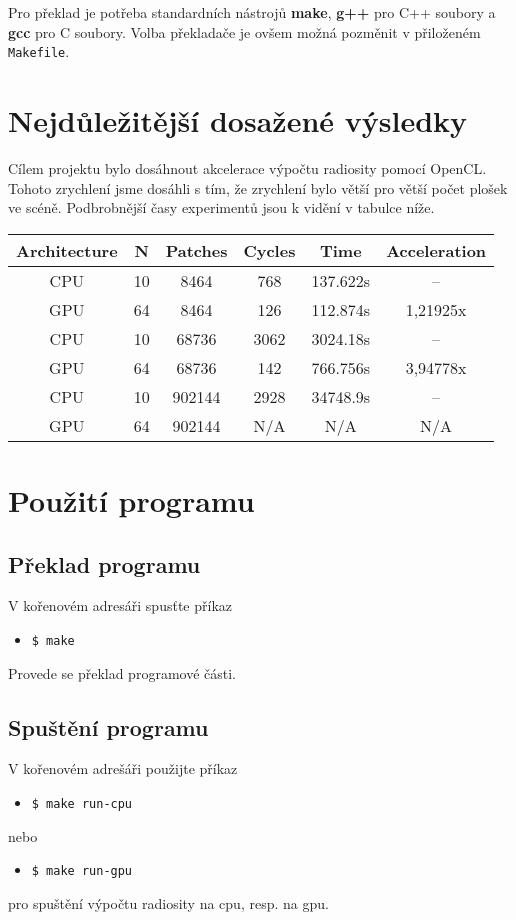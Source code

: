 \documentclass[11pt,a4paper]{article}
\begin{document}
Pro překlad je potřeba standardních nástrojů \textbf{make}, \textbf{g++} pro C++ soubory a \textbf{gcc} pro C soubory. Volba překladače je ovšem možná pozměnit v přiloženém \texttt{Makefile}.


\section{Nejdůležitější dosažené výsledky}
Cílem projektu bylo dosáhnout akcelerace výpočtu radiosity pomocí OpenCL. Tohoto zrychlení jsme dosáhli s tím, že zrychlení bylo větší pro větší počet plošek ve scéně. Podbrobnější časy experimentů jsou k vidění v tabulce níže.

\begin{center}
    \begin{tabular}{| c | c | c | c | c | c |}
      \hline
      Architecture & N & Patches & Cycles & Time & Acceleration \\
      \hline
      CPU & 10 & 8464 & 768 & 137.622s & -- \\
      GPU & 64 & 8464 & 126 & 112.874s & 1,21925x \\
      \hline
      CPU & 10 & 68736 & 3062 & 3024.18s & -- \\
      GPU & 64 & 68736 & 142 & 766.756s & 3,94778x \\
      \hline
      CPU & 10 & 902144 & 2928 & 34748.9s & -- \\
      GPU & 64 & 902144 & N/A & N/A & N/A \\
      \hline
    \end{tabular}
\end{center}

\section{Použití programu}

\subsection{Překlad programu}
V kořenovém adresáři spusťte příkaz
\begin{itemize}
  \item[] \texttt{\$ make}
\end{itemize}
Provede se překlad programové části.


\subsection{Spuštění programu}
V kořenovém adrešáři použijte příkaz
\begin{itemize}
  \item[] \texttt{\$ make run-cpu}
\end{itemize}
nebo
\begin{itemize}
  \item[] \texttt{\$ make run-gpu}
\end{itemize}
pro spuštění výpočtu radiosity na cpu, resp. na gpu.
\end{document}
